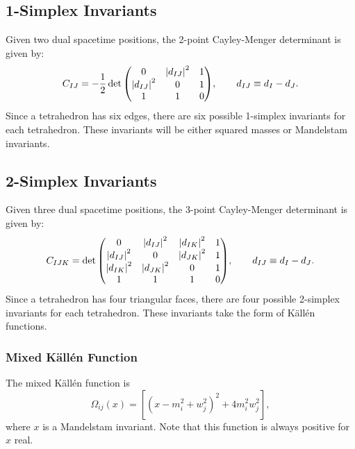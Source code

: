 \subsection{1-Simplex Invariants}
Given two dual spacetime positions, the 2-point Cayley-Menger determinant is given by:
\begin{equation}
	C_{IJ} = -\frac{1}{2} \det{
	\begin{pmatrix}
	0 & \left\lvert d_{IJ} \right\rvert^{2} & 1 \\
	\left\lvert d_{IJ} \right\rvert^{2} & 0 & 1 \\
	1 & 1 & 0
	\end{pmatrix}
	}, \qquad d_{IJ} \equiv d_{I} - d_{J}.
\end{equation}
Since a tetrahedron has six edges, there are six possible 1-simplex invariants for each tetrahedron. These invariants will be either squared masses or Mandelstam invariants.
\subsection{2-Simplex Invariants}
Given three dual spacetime positions, the 3-point Cayley-Menger determinant is given by:
\begin{equation}
	C_{IJK} = \det{
	\begin{pmatrix}
	0 & \left\lvert d_{IJ} \right\rvert^{2} & \left\lvert d_{IK} \right\rvert^{2} & 1 \\
	\left\lvert d_{IJ} \right\rvert^{2} & 0 & \left\lvert d_{JK} \right\rvert^{2} & 1 \\
	\left\lvert d_{IK} \right\rvert^{2} & \left\lvert d_{JK} \right\rvert^{2} & 0 & 1 \\
	1 & 1 & 1 & 0
	\end{pmatrix}
	}, \qquad d_{IJ} \equiv d_{I} - d_{J}.
\end{equation}
Since a tetrahedron has four triangular faces, there are four possible 2-simplex invariants for each tetrahedron. These invariants take the form of K\"{a}ll\'{e}n functions.
\subsubsection{Mixed K\"{a}ll\'{e}n Function}
The mixed K\"{a}ll\'{e}n function is
\begin{equation}
	\Omega_{ij}(x) = \left[ \left(x - m_{i}^{2} + w_{j}^{2} \right)^{2} + 4 m_{i}^{2} w_{j}^{2} \right],
\end{equation}
where $x$ is a Mandelstam invariant. Note that this function is always positive for $x$ real.
